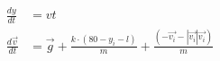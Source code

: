 \documentclass[preview]{standalone}
\begin{document}
\begin{align*}
\quad\\
            \frac{dy}{dt}&=vt     \quad\\
            \frac{d\vec{v}}{dt}&=\vec{g}+\frac{k\cdot(80-y_i-l)}{ m }+\frac{(-\vec{v_i}-|\vec{v_i}|\vec{v_i})}{ m }
\end{align*}
\end{document}
